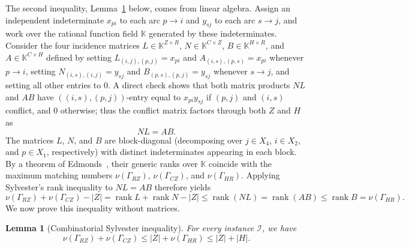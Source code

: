 \documentclass[11pt]{amsart}
\newtheorem{lemma}[theorem]{Lemma}
\theoremstyle{remark}
\newcommand{\abs}[1]{\lvert #1\rvert}
\DeclareMathOperator{\rank}{rank}
\begin{document}
The second inequality, Lemma~\ref{lem:rank} below, comes from linear algebra. Assign an independent indeterminate $x_{pi}$ to each arc $p\to i$ and $y_{sj}$ to each arc $s\to j$, and work over the rational function field $\mathbb K$ generated by these indeterminates. Consider the four incidence matrices $L\in\mathbb K^{Z\times R}$, $N\in\mathbb K^{C\times Z}$, $B\in\mathbb K^{H\times R}$, and $A\in\mathbb K^{C\times H}$ defined by setting $L_{(i,j),(p,j)}=x_{pi}$ and $A_{(i,s),(p,s)}=x_{pi}$ whenever $p\to i$, setting $N_{(i,s),(i,j)}=y_{sj}$ and $B_{(p,s),(p,j)}=y_{sj}$ whenever $s\to j$, and setting all other entries to $0$. A direct check shows that both matrix products $NL$ and $AB$ have $((i,s),(p,j))$-entry equal to $x_{pi}y_{sj}$ if $(p,j)$ and $(i,s)$ conflict, and $0$ otherwise; thus the conflict matrix factors through both $Z$ and $H$ as
\[
  NL=AB.
\]
The matrices $L$, $N$, and $B$ are block-diagonal (decomposing over $j\in X_4$, $i\in X_2$, and $p\in X_1$, respectively) with distinct indeterminates appearing in each block. By a theorem of Edmonds~\cite{Edmonds}, their generic ranks over $\mathbb K$ coincide with the maximum matching numbers $\nu(\Gamma_{RZ})$, $\nu(\Gamma_{CZ})$, and $\nu(\Gamma_{HR})$. Applying Sylvester's rank inequality to $NL=AB$ therefore yields
\[
  \nu(\Gamma_{RZ})+\nu(\Gamma_{CZ})-\abs Z=\rank L+\rank N-\abs Z\le\rank(NL)=\rank(AB)\le\rank B=\nu(\Gamma_{HR}).
\]
We now prove this inequality without matrices.

\begin{lemma}[Combinatorial Sylvester inequality]\label{lem:rank}
For every instance $\mathcal I$, we have
\[
  \nu(\Gamma_{RZ})+\nu(\Gamma_{CZ})\le\abs Z+\nu(\Gamma_{HR})\le\abs Z+\abs H.
\]
\end{lemma}
\end{document}
